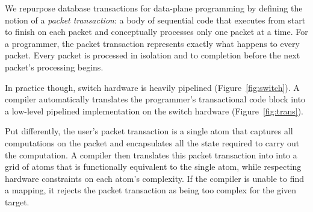 We repurpose database transactions for data-plane programming by defining the
notion of a \textit{packet transaction}: a body of sequential code that
executes from start to finish on each packet and conceptually processes only
one packet at a time. For a programmer, the packet transaction represents
exactly what happens to every packet. Every packet is processed in isolation
and to completion before the next packet's processing begins.

In practice though, switch hardware is heavily pipelined
(Figure~\ref{fig:switch}).  A compiler automatically translates the
programmer's transactional code block into a low-level pipelined implementation
on the switch hardware (Figure~\ref{fig:trans}).

Put differently, the user's packet transaction is a single atom that captures
all computations on the packet and encapsulates all the state required to carry
out the computation.  A compiler then translates this packet transaction into
into a grid of atoms that is functionally equivalent to the single atom, while
respecting hardware constraints on each atom's complexity. If the compiler is
unable to find a mapping, it rejects the packet transaction as being too
complex for the given target.

